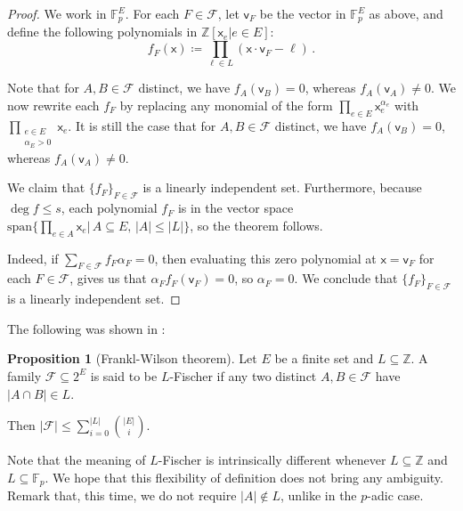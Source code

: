\documentclass[12pt]{amsart}
\theoremstyle{definition}
\newtheorem{prop}[thm]{Proposition}
\newcommand{\Z}{\mathbb{Z}}
\newcommand{\F}{\mathbb{F}}
\newcommand{\FF}{\mathcal F}
\newcommand{\vv}{\mathsf{v}}
\newcommand{\vx}{\mathsf{x}}
\newcommand{\spn}{\mathrm{span}}
\begin{document}
\begin{proof}
We work in $\F_p^E$.
For each $F \in \FF$, let $\vv_F$ be the vector in $\F_p^E$ as above, and define the following polynomials in $\Z[\vx_e | e \in E]$:
$$f_F(\vx) \coloneqq \prod_{\ell \in L} (\vx \cdot \vv_F - \ell ) \, .$$

Note that for $A, B \in \FF$ distinct, we have $f_A(\vv_B) = 0$, whereas $f_A(\vv_A) \neq 0$.
We now rewrite each $f_F$ by replacing any monomial of the form $\prod_{e\in E}\vx_e^{\alpha_e}$ with $\prod_{\substack{e\in E\\ \alpha_E > 0}}\vx_e$.
It is still the case that for $A, B \in \FF$ distinct, we have $f_A(\vv_B) = 0$, whereas $f_A(\vv_A) \neq 0$.

We claim that $\{ f_F \}_{F \in \FF}$ is a linearly independent set.
Furthermore, because $\deg f \leq s$, each polynomial $f_F$ is in the vector space $\spn\{\prod_{e \in A} \vx_e | \, A \subseteq E, \, |A| \leq |L| \}$, so the theorem follows.

Indeed, if $\sum_{F \in \FF} f_F \alpha_F =0$, then evaluating this zero polynomial at $\vx = \vv_F $ for each $F \in \FF$, gives us that $\alpha_F f_F(\vv_F) = 0$, so $\alpha_F = 0$. 
We conclude that $\{ f_F \}_{F \in \FF}$ is a linearly independent set.
\end{proof}

The following was shown in \cite{hsieh1975intersection}:

\begin{prop}[Frankl-Wilson theorem]
Let $E$ be a finite set and $L \subseteq \Z$.
A family $\FF \subseteq 2^E$ is said to be $L$-Fischer if any two distinct $A, B \in \FF $ have $|A\cap B| \in L$.

Then $|\FF| \leq \sum_{i=0}^{|L|} \binom{|E|}{i}$.
\end{prop}

Note that the meaning of $L$-Fischer is intrinsically different whenever $L \subseteq \Z$ and $L \subseteq \F_p$.
We hope that this flexibility of definition does not bring any ambiguity.
Remark that, this time, we do not require $|A|\not\in L$, unlike in the $p$-adic case.
\end{document}

